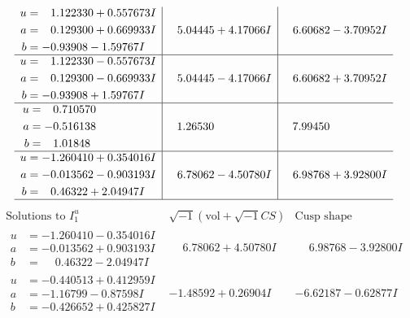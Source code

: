 \documentclass[1p]{elsarticle_modified}
\theoremstyle{definition}
\newcommand{\I}{\sqrt{-1}}
\begin{document}
$$\begin{array}{c|c|c}
\begin{aligned}
u &= \phantom{-}1.122330 + 0.557673 I \\
a &= \phantom{-}0.129300 + 0.669933 I \\
b &= -0.93908 - 1.59767 I\end{aligned}
 & \phantom{-}5.04445 + 4.17066 I & \phantom{-}6.60682 - 3.70952 I \\ \hline\begin{aligned}
u &= \phantom{-}1.122330 - 0.557673 I \\
a &= \phantom{-}0.129300 - 0.669933 I \\
b &= -0.93908 + 1.59767 I\end{aligned}
 & \phantom{-}5.04445 - 4.17066 I & \phantom{-}6.60682 + 3.70952 I \\ \hline\begin{aligned}
u &= \phantom{-}0.710570\phantom{ +0.000000I} \\
a &= -0.516138\phantom{ +0.000000I} \\
b &= \phantom{-}1.01848\phantom{ +0.000000I}\end{aligned}
 & \phantom{-}1.26530\phantom{ +0.000000I} & \phantom{-}7.99450\phantom{ +0.000000I} \\ \hline\begin{aligned}
u &= -1.260410 + 0.354016 I \\
a &= -0.013562 - 0.903193 I \\
b &= \phantom{-}0.46322 + 2.04947 I\end{aligned}
 & \phantom{-}6.78062 - 4.50780 I & \phantom{-}6.98768 + 3.92800 I\\
 \hline 
 \end{array}$$\newpage$$\begin{array}{c|c|c}  
\text{Solutions to }I^u_{1}& \I (\text{vol} + \sqrt{-1}CS) & \text{Cusp shape}\\
 \hline 
\begin{aligned}
u &= -1.260410 - 0.354016 I \\
a &= -0.013562 + 0.903193 I \\
b &= \phantom{-}0.46322 - 2.04947 I\end{aligned}
 & \phantom{-}6.78062 + 4.50780 I & \phantom{-}6.98768 - 3.92800 I \\ \hline\begin{aligned}
u &= -0.440513 + 0.412959 I \\
a &= -1.16799 - 0.87598 I \\
b &= -0.426652 + 0.425827 I\end{aligned}
 & -1.48592 + 0.26904 I & -6.62187 - 0.62877 I \\ \hline\begin{aligned}

\end{aligned}
\end{array}$$
\end{document}
